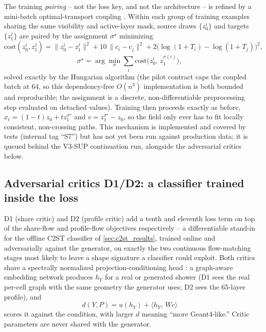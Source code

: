 \documentclass[10pt,a4paper]{article}
\begin{document}
The training \emph{pairing} -- not the loss key, and not the architecture -- is refined by a mini-batch optimal-transport coupling \cite{ot_cfm}. Within each group of training examples sharing the same visibility and active-layer mask, source draws $\{z_0^i\}$ and targets $\{z_1^j\}$ are paired by the assignment $\sigma^\star$ minimizing
\begin{equation}
\mathrm{cost}(z_0^i, z_1^j) = \big\lVert z_0^i - z_1^j \big\rVert^2 + 10\, \big\lVert c_i - c_j \big\rVert^2 + 2\Big(\log(1{+}T_i) - \log(1{+}T_j)\Big)^2,
\label{eq:otcfm_cost}
\end{equation}
\begin{equation}
\sigma^\star = \arg\min_\sigma \sum_i \mathrm{cost}\big(z_0^i,\, z_1^{\sigma(i)}\big),
\label{eq:otcfm_assignment}
\end{equation}
solved exactly by the Hungarian algorithm (the pilot contract caps the coupled batch at 64, so this dependency-free $O(n^3)$ implementation is both bounded and reproducible; the assignment is a discrete, non-differentiable preprocessing step evaluated on detached values). Training then proceeds exactly as before, $x_t = (1-t)z_0 + t z_1^{\sigma^\star}$ and $v = z_1^{\sigma^\star} - z_0$, so the field only ever has to fit locally consistent, non-crossing paths. This mechanism is implemented and covered by tests (internal tag ``S7'') but has not yet been run against production data; it is queued behind the V3-SUP continuation run, alongside the adversarial critics below.

\subsection{Adversarial critics D1/D2: a classifier trained inside the loss}
\label{sec:adversarial}
D1 (share critic) and D2 (profile critic) add a tenth and eleventh loss term on top of the share-flow and profile-flow objectives respectively -- a differentiable stand-in for the offline C2ST classifier of \cref{sec:c2st_results}, trained online and adversarially against the generator, on exactly the two continuous flow-matching stages most likely to leave a shape signature a classifier could exploit. Both critics share a spectrally normalized projection-conditioning head \cite{spectral_norm,projection_discriminator}: a graph-aware embedding network produces $h_Y$ for a real or generated shower (D1 sees the real per-cell graph with the same geometry the generator uses; D2 sees the 65-layer profile), and
\begin{equation}
d(Y, P) = u(h_Y) + \langle h_Y,\, W c \rangle
\label{eq:critic_score}
\end{equation}
scores it against the condition, with larger $d$ meaning ``more Geant4-like.'' Critic parameters are never shared with the generator.
\end{document}
